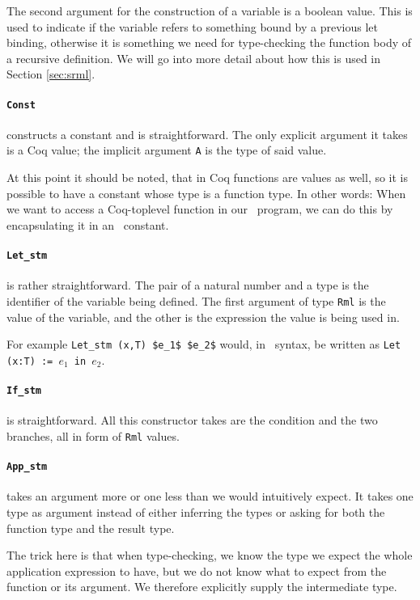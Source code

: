 \documentclass[11pt, leqno, titlepage]{article}
\def\coqe{\lstinline[language=Coq, basicstyle=\small]}
\theoremstyle{definition}
\begin{document}
The second argument for the construction of a variable is a boolean value. This is
used to indicate if the variable refers to something bound by a previous let binding,
otherwise it is something we need for type-checking the function body of a recursive
definition. We will go into more detail about how this is used in Section \ref{sec:srml}.

\paragraph{\coqe{Const}} constructs a constant and is straightforward. The only explicit
argument it takes is a Coq value; the implicit argument \texttt{A} is the type of
said value.

At this point it should be noted, that in Coq functions are values as well, so it is
possible to have a constant whose type is a function type. In other words: When we
want to access a Coq-toplevel function in our \rmlx\ program, we can do this by
encapsulating it in an \rmlx\ constant. 

\paragraph{\coqe{Let_stm}} is rather straightforward. The pair of a natural number and a
type is the identifier of the variable being defined. The first argument of type
\coqe{Rml} is the value of the variable, and the other is the expression the value is
being used in.

For example \coqe{Let_stm (x,T) $e_1$ $e_2$} would, in \rml\ syntax, be written as
\texttt{Let (x:T) := $e_1$ in $e_2$}. 

\paragraph{\coqe{If_stm}} is straightforward. All this constructor takes are the condition
and the two branches, all in form of \coqe{Rml} values.

\paragraph{\coqe{App_stm}} takes an argument more or one less than we would
intuitively expect. It takes one type as argument instead of either inferring the
types or asking for both the function type and the result type.

The trick here is that when type-checking, we know the type we expect the whole application
expression to have, but we do not know what to expect from the function or its
argument. We therefore explicitly supply the intermediate type. 
\end{document}
